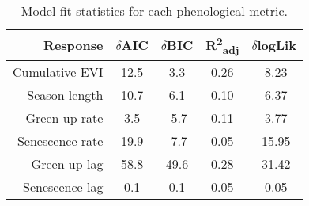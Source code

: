 \begin{table}[H]
\centering
\begin{tabular}{rcccc}
  \hline
Response & $\delta$AIC & $\delta$BIC & R\textsuperscript{2}\textsubscript{adj} & $\delta$logLik \\ 
  \hline
Cumulative EVI & 12.5 & 3.3 & 0.26 & -8.23 \\ 
  Season length & 10.7 & 6.1 & 0.10 & -6.37 \\ 
  Green-up rate & 3.5 & -5.7 & 0.11 & -3.77 \\ 
  Senescence rate & 19.9 & -7.7 & 0.05 & -15.95 \\ 
  Green-up lag & 58.8 & 49.6 & 0.28 & -31.42 \\ 
  Senescence lag & 0.1 & 0.1 & 0.05 & -0.05 \\ 
   \hline
\end{tabular}
\caption{Model fit statistics for each phenological metric.} 
\label{mod_stat}
\end{table}

